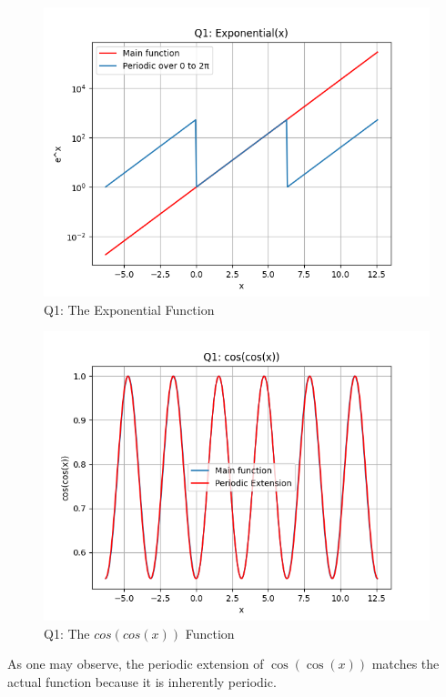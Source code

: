 \documentclass[11pt, a4paper]{article}
\begin{document}
   \begin{figure}[!tbh]
   	\centering
   	  \includegraphics[scale=0.5]{q1-f1.png} 
     \caption{Q1: The Exponential Function}
   	\label{fig:Q1-f1}
   \end{figure}

   \begin{figure}[!tbh]
   	\centering
   	  \includegraphics[scale=0.5]{q1-f2.png} 
    \caption{Q1: The $cos(cos(x))$ Function}
   	\label{fig:Q1-f1}
   \end{figure}
	\newpage
    As one may observe, the periodic extension of $\cos(\cos(x))$ matches the actual function because it is inherently periodic.
    
    
\end{document}
